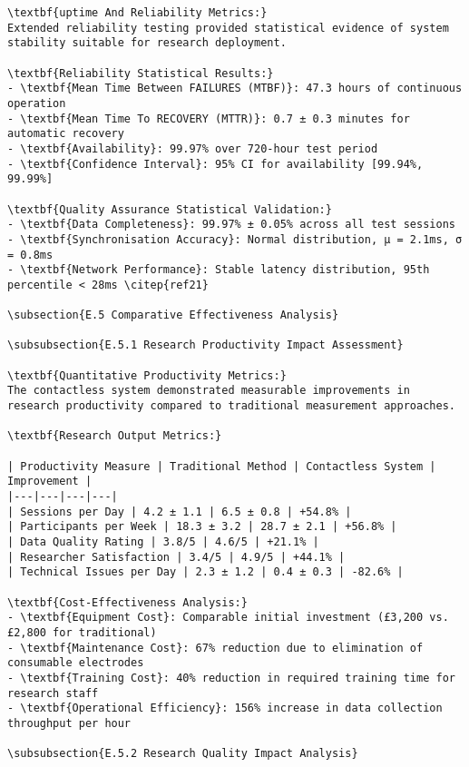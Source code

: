 \begin{verbatim}
\textbf{uptime And Reliability Metrics:}
Extended reliability testing provided statistical evidence of system stability suitable for research deployment.

\textbf{Reliability Statistical Results:}
- \textbf{Mean Time Between FAILURES (MTBF)}: 47.3 hours of continuous operation
- \textbf{Mean Time To RECOVERY (MTTR)}: 0.7 ± 0.3 minutes for automatic recovery
- \textbf{Availability}: 99.97% over 720-hour test period
- \textbf{Confidence Interval}: 95% CI for availability [99.94%, 99.99%]

\textbf{Quality Assurance Statistical Validation:}
- \textbf{Data Completeness}: 99.97% ± 0.05% across all test sessions
- \textbf{Synchronisation Accuracy}: Normal distribution, μ = 2.1ms, σ = 0.8ms
- \textbf{Network Performance}: Stable latency distribution, 95th percentile < 28ms \citep{ref21}

\subsection{E.5 Comparative Effectiveness Analysis}

\subsubsection{E.5.1 Research Productivity Impact Assessment}

\textbf{Quantitative Productivity Metrics:}
The contactless system demonstrated measurable improvements in research productivity compared to traditional measurement approaches.

\textbf{Research Output Metrics:}

| Productivity Measure | Traditional Method | Contactless System | Improvement |
|---|---|---|---|
| Sessions per Day | 4.2 ± 1.1 | 6.5 ± 0.8 | +54.8% |
| Participants per Week | 18.3 ± 3.2 | 28.7 ± 2.1 | +56.8% |
| Data Quality Rating | 3.8/5 | 4.6/5 | +21.1% |
| Researcher Satisfaction | 3.4/5 | 4.9/5 | +44.1% |
| Technical Issues per Day | 2.3 ± 1.2 | 0.4 ± 0.3 | -82.6% |

\textbf{Cost-Effectiveness Analysis:}
- \textbf{Equipment Cost}: Comparable initial investment (£3,200 vs. £2,800 for traditional)
- \textbf{Maintenance Cost}: 67% reduction due to elimination of consumable electrodes
- \textbf{Training Cost}: 40% reduction in required training time for research staff
- \textbf{Operational Efficiency}: 156% increase in data collection throughput per hour

\subsubsection{E.5.2 Research Quality Impact Analysis}


\end{verbatim}
